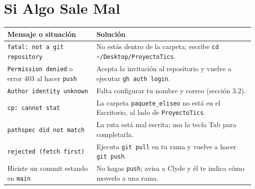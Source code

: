 \documentclass[11pt,a4paper]{article}
\begin{document}
\section{Si Algo Sale Mal}
{\small
{}
\noindent\begin{tabularx}{\textwidth}{@{}P{5.2cm} L@{}}
\toprule
{}
\textbf{Mensaje o situación} & \textbf{Solución} \\
\midrule
\texttt{fatal: not a git repository} & No estás dentro de la carpeta; escribe \nolinkurl{cd ~/Desktop/ProyectoTics}. \\
\texttt{Permission denied} o error 403 al hacer \texttt{push} & Acepta la invitación al repositorio y vuelve a ejecutar \texttt{gh auth login}. \\
\texttt{Author identity unknown} & Falta configurar tu nombre y correo (sección 3.2). \\
\texttt{cp: cannot stat} & La carpeta \texttt{paquete\_eliseo} no está en el Escritorio, al lado de \texttt{ProyectoTics}. \\
\texttt{pathspec did not match} & La ruta está mal escrita; usa la tecla Tab para completarla. \\
\texttt{rejected (fetch first)} & Ejecuta \texttt{git pull} en tu rama y vuelve a hacer \texttt{git push}. \\
Hiciste un commit estando en \texttt{main} & No hagas \texttt{push}; avisa a Clyde y él te indica cómo moverlo a una rama. \\
\bottomrule
\end{tabularx}
}
\end{document}
